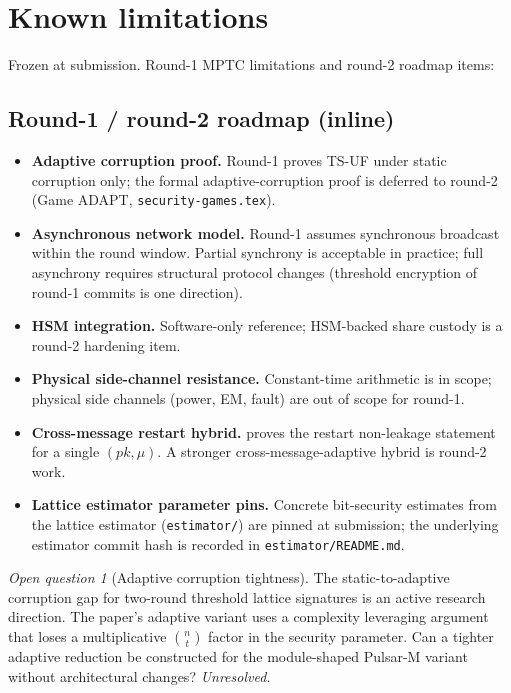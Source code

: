 \documentclass[11pt,a4paper]{article}
\theoremstyle{definition}
\theoremstyle{remark}
\newtheorem{openq}{Open question}
\begin{document}
\section{Known limitations}
\label{sec:knownlimits}
Frozen at submission. Round-1 MPTC limitations and round-2 roadmap
items:



\subsection{Round-1 / round-2 roadmap (inline)}

\begin{itemize}[leftmargin=*, itemsep=0pt]
\item \textbf{Adaptive corruption proof.} Round-1 proves
TS-UF under static corruption only; the formal adaptive-corruption
proof is deferred to round-2 (Game ADAPT, \texttt{security-games.tex}).
\item \textbf{Asynchronous network model.} Round-1 assumes synchronous
broadcast within the round window. Partial synchrony is acceptable
in practice; full asynchrony requires structural protocol changes
(threshold encryption of round-1 commits is one direction).
\item \textbf{HSM integration.} Software-only reference; HSM-backed
share custody is a round-2 hardening item.
\item \textbf{Physical side-channel resistance.} Constant-time
arithmetic is in scope; physical side channels (power, EM, fault) are
out of scope for round-1.
\item \textbf{Cross-message restart hybrid.} 
proves the restart non-leakage statement for a single $(\mathit{pk},
\mu)$. A stronger cross-message-adaptive hybrid is round-2 work.
\item \textbf{Lattice estimator parameter pins.} Concrete bit-security
estimates from the lattice estimator (\texttt{estimator/}) are
pinned at submission; the underlying estimator commit hash is
recorded in \texttt{estimator/README.md}.
\end{itemize}

\begin{openq}[Adaptive corruption tightness]
The static-to-adaptive corruption gap for two-round threshold
lattice signatures is an active research direction. The
\cite{boschini2024corona} paper's adaptive variant uses a complexity
leveraging argument that loses a multiplicative
$\binom{n}{t}$ factor in the security parameter. Can a tighter
adaptive reduction be constructed for the module-shaped
Pulsar-M variant without architectural changes? \emph{Unresolved.}
\end{openq}
\end{document}
